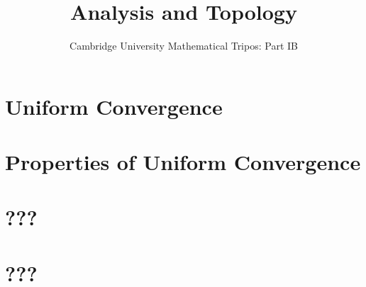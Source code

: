 \documentclass{article}
\title{Analysis and Topology}
\author{Cambridge University Mathematical Tripos: Part IB}
\begin{document}
\maketitle

\tableofcontentsnewpage{}

\section{Uniform Convergence}

\section{Properties of Uniform Convergence}

\section{???}

\section{???}

\end{document}

